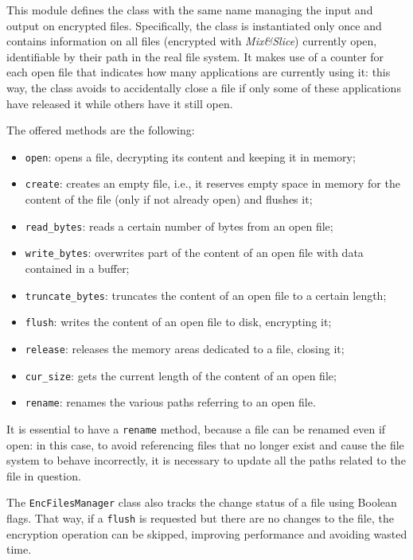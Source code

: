\documentclass[a4paper,12pt,twoside,openright]{report}
\begin{document}
  This module defines the class with the same name managing the input and output on encrypted files.
  Specifically, the class is instantiated only once and contains information on all files
  (encrypted with \textit{Mix\&Slice}) currently open, identifiable by their path in the real file system.
  It makes use of a counter for each open file that indicates how many applications are currently using it:
  this way, the class avoids to accidentally close a file if only some of these applications have released it
  while others have it still open.

  The offered methods are the following:
  \begin{itemize}
    \item \texttt{open}: opens a file, decrypting its content and keeping it in memory;
    \item \texttt{create}: creates an empty file, i.e., it reserves empty space in memory for the content of the file
          (only if not already open) and flushes it;
    \item \texttt{read\_bytes}: reads a certain number of bytes from an open file;
    \item \texttt{write\_bytes}: overwrites part of the content of an open file with data contained in a buffer;
    \item \texttt{truncate\_bytes}: truncates the content of an open file to a certain length;
    \item \texttt{flush}: writes the content of an open file to disk, encrypting it;
    \item \texttt{release}: releases the memory areas dedicated to a file, closing it;
    \item \texttt{cur\_size}: gets the current length of the content of an open file;
    \item \texttt{rename}: renames the various paths referring to an open file.
  \end{itemize}

  It is essential to have a \texttt{rename} method, because a file can be renamed even if open:
  in this case, to avoid referencing files that no longer exist and cause the file system to behave incorrectly,
  it is necessary to update all the paths related to the file in question.
  
  The \texttt{EncFilesManager} class also tracks the change status of a file using Boolean flags.
  That way, if a \texttt{flush} is requested but there are no changes to the file,
  the encryption operation can be skipped, improving performance and avoiding wasted time.
\end{document}

